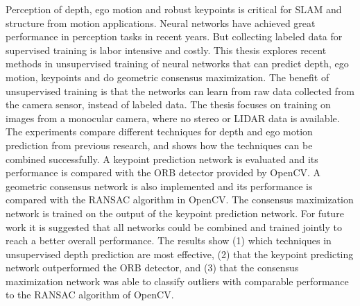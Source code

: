 Perception of depth, ego motion and robust keypoints is critical for SLAM and structure from motion applications. Neural networks have achieved great performance in perception tasks in recent years. But collecting labeled data for supervised training is labor intensive and costly. This thesis explores recent methods in unsupervised training of neural networks that can predict depth, ego motion, keypoints and do geometric consensus maximization. The benefit of unsupervised training is that the networks can learn from raw data collected from the camera sensor, instead of labeled data. The thesis focuses on training on images from a monocular camera, where no stereo or LIDAR data is available. The experiments compare different techniques for depth and ego motion prediction from previous research, and shows how the techniques can be combined successfully. A keypoint prediction network is evaluated and its performance is compared with the ORB detector provided by OpenCV. A geometric consensus network is also implemented and its performance is compared with the RANSAC algorithm in OpenCV. The consensus maximization network is trained on the output of the keypoint prediction network. For future work it is suggested that all networks could be combined and trained jointly to reach a better overall performance. The results show (1) which techniques in unsupervised depth prediction are most effective, (2) that the keypoint predicting network outperformed the ORB detector, and (3) that the consensus maximization network was able to classify outliers with comparable performance to the RANSAC algorithm of OpenCV.
